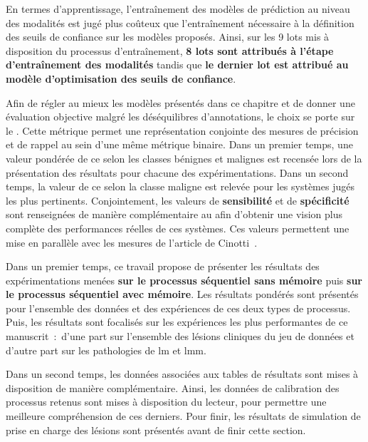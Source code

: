 En termes d'apprentissage, l'entraînement des modèles de prédiction au niveau des modalités est jugé plus coûteux que l'entraînement nécessaire à la définition des seuils de confiance sur les modèles proposés. Ainsi, sur les 9 lots mis à disposition du processus d'entraînement, \textbf{8 lots sont attribués à l'étape d'entraînement des modalités} tandis que \textbf{le dernier lot est attribué au modèle d'optimisation des seuils de confiance}.\par

Afin de régler au mieux les modèles présentés dans ce chapitre et de donner une évaluation objective malgré les déséquilibres d'annotations, le choix se porte sur le \textbf{\fscore{}}. Cette métrique permet une représentation conjointe des mesures de précision et de rappel au sein d'une même métrique binaire. Dans un premier temps, une valeur pondérée de ce \fscore{} selon les classes bénignes et malignes est recensée lors de la présentation des résultats pour chacune des expérimentations. Dans un second temps, la valeur de ce \fscore{} selon la classe maligne est relevée pour les systèmes jugés les plus pertinents. Conjointement, les valeurs de \textbf{sensibilité} et de \textbf{spécificité} sont renseignées de manière complémentaire au \fscore{} afin d'obtenir une vision plus complète des performances réelles de ces systèmes. Ces valeurs permettent une mise en parallèle avec les mesures de l'article de Cinotti~.\par

Dans un premier temps, ce travail propose de présenter les résultats des expérimentations menées \textbf{sur le processus séquentiel sans mémoire} puis \textbf{sur le processus séquentiel avec mémoire}. Les résultats pondérés sont présentés pour l'ensemble des données et des expériences de ces deux types de processus. Puis, les résultats sont focalisés sur les expériences les plus performantes de ce manuscrit~:~d'une part sur l'ensemble des lésions cliniques du jeu de données et d'autre part sur les pathologies de \gls{lm} et \gls{lmm}.\par

Dans un second temps, les données associées aux tables de résultats sont mises à disposition de manière complémentaire. Ainsi, les données de calibration des processus retenus sont mises à disposition du lecteur, pour permettre une meilleure compréhension de ces derniers. Pour finir, les résultats de simulation de prise en charge des lésions sont présentés avant de finir cette section.\par
\clearpage

